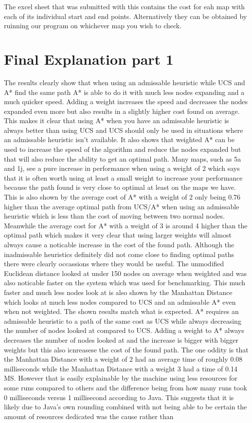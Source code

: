 \documentclass[11pt]{article} %
\begin{document}
The excel sheet that was submitted with this contains the cost for eah map with each of its individual start and end points. Alternatively they can be obtained by ruinning our program on whichever map you wish to check.



\section{Final Explanation part 1}
The results clearly show that when using an admissable heuristic while UCS and A* find the same path A* is able to do it with much less nodes expanding and a much quicker speed. Adding a weight increases the speed and decreases the nodes expanded even more but also results in a slightly higher cost found on average. This makes it clear that using A* when you have an admissable heuristic is always better than using UCS and UCS should only be used in situations where an admissable heuristic isn't available. It also shows that weighted A* can be used to increase the speed of the algorithm and reduce the nodes expanded but that will also reduce the ability to get an optimal path. Many maps, such as 5a and 1j, see a pure increase in performance when using a weight of 2 which says that it is often worth using at least a small weight to increase your performance because the path found is very close to optimal at least on the maps we have. This is also shown by the average cost of A* with a weight of 2 only being 0.76 higher than the average optimal path from UCS/A* when using an admissable heuristic which is less than the cost of moving between two normal nodes. Meanwhile the average cost for A* with a weight of 3 is around 4 higher than the optimal path which makes it very clear that using larger weights will almost always cause a noticable increase in the cost of the found path. Although the inadmissable heuristics definitely did not come close to finding optimal paths there were clearly occassions where they would be useful. The unmodified Euclidean distance looked at under 150 nodes on average when weighted and was also noticable faster on the system which was used for benchmarking. This much faster and much less nodes look at is also shown by the Manhattan Distance which looks at much less nodes compared to UCS and an admissable A* even when not weighted. The shown results match what is expected. A* requires an admissable heuristic to a path of the same cost as UCS while always decreasing the number  of nodes looked at compared to UCS. Adding a weight to A* always decreases the number of nodes looked at and the increase is bigger with bigger weights but this also icnreasese the cost of the found path. The one oddity is that the Manhattan Distance with a weight of 2 had an average time of roughly 0.08 milliseconds while the Manhattan Distance with a weight 3 had a time of 0.14 MS. However that is easily explainable by the machine using less resources for some runs compared to others and the difference being from how many runs took 0 milliseconds versus 1 millisecond according to Java. This suggests that it is likely due to Java's own rounding combined with not being able to be certain the amount of resources dedicated was the cause rather than 
\end{document}
